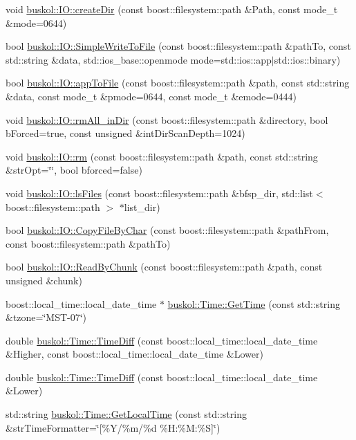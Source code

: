 \begin{DoxyCompactItemize}
void \hyperlink{group__libbuskol_ga7dbaadfa6e4b5ba4a815651e5cfadde9}{buskol::IO::createDir} (const boost::filesystem::path \&Path, const mode\_\-t \&mode=0644)
\item 
bool \hyperlink{group__libbuskol_ga5ac0350b87e4d108b9e975916ee0e7f5}{buskol::IO::SimpleWriteToFile} (const boost::filesystem::path \&pathTo, const std::string \&data, std::ios\_\-base::openmode mode=std::ios::app$|$std::ios::binary)
\item 
bool \hyperlink{group__libbuskol_gaada29d4b7a4c47579e1b25ea63c47e15}{buskol::IO::appToFile} (const boost::filesystem::path \&path, const std::string \&data, const mode\_\-t \&pmode=0644, const mode\_\-t \&emode=0444)
\item 
void \hyperlink{group__libbuskol_gab3ce3dff1ea5fedde1eff01ae94297ae}{buskol::IO::rmAll\_\-inDir} (const boost::filesystem::path \&directory, bool bForced=true, const unsigned \&intDirScanDepth=1024)
\item 
void \hyperlink{group__libbuskol_ga38a9328ed6fbfed356b401e209204da2}{buskol::IO::rm} (const boost::filesystem::path \&path, const std::string \&strOpt=\char`\"{}\char`\"{}, bool bforced=false)
\item 
void \hyperlink{group__libbuskol_ga172cf5b6503f899737f413d631a4d6ca}{buskol::IO::lsFiles} (const boost::filesystem::path \&bfsp\_\-dir, std::list$<$ boost::filesystem::path $>$ $\ast$list\_\-dir)
\item 
bool \hyperlink{group__libbuskol_gafbb450f6ce225235ad7ccab77883aa18}{buskol::IO::CopyFileByChar} (const boost::filesystem::path \&pathFrom, const boost::filesystem::path \&pathTo)
\item 
bool \hyperlink{group__libbuskol_gac93438593df503ce260ed0a9ec1e5249}{buskol::IO::ReadByChunk} (const boost::filesystem::path \&path, const unsigned \&chunk)
\item 
boost::local\_\-time::local\_\-date\_\-time $\ast$ \hyperlink{group__libbuskol_ga6302b620351164dda28cc6d9d1b81aa5}{buskol::Time::GetTime} (const std::string \&tzone=\char`\"{}MST-\/07\char`\"{})
\item 
double \hyperlink{group__libbuskol_gac6d1980cc97a5c78f36a3fd96ceaa573}{buskol::Time::TimeDiff} (const boost::local\_\-time::local\_\-date\_\-time \&Higher, const boost::local\_\-time::local\_\-date\_\-time \&Lower)
\item 
double \hyperlink{group__libbuskol_ga4fe6f31191f95b9231ac7c44629ef203}{buskol::Time::TimeDiff} (const boost::local\_\-time::local\_\-date\_\-time \&Lower)
\item 
std::string \hyperlink{group__libbuskol_ga87e1c767f9a8af7b2d13eb977d60d872}{buskol::Time::GetLocalTime} (const std::string \&strTimeFormatter=\char`\"{}\mbox{[}\%Y/\%m/\%d \%H:\%M:\%S\mbox{]}\char`\"{})
\end{DoxyCompactItemize}


